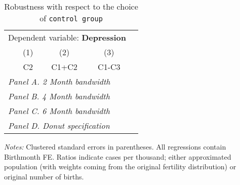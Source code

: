  \begin{table}[H] \begin{threeparttable} \centering \caption{Robustness with respect to the choice of \texttt{control group}} {\def\sym#1{\ifmmode^{#1}\else\(^{#1}\)\fi} \begin{tabular}{l*{4}{c}} \toprule \multicolumn{4}{c}{Dependent variable: \textbf{Depression}} \\ \cmidrule(lr){2-4}
            &\multicolumn{1}{c}{(1)}&\multicolumn{1}{c}{(2)}&\multicolumn{1}{c}{(3)}\\
            &\multicolumn{1}{c}{C2}&\multicolumn{1}{c}{C1+C2}&\multicolumn{1}{c}{C1-C3}\\
\midrule
 \multicolumn{4}{l}{\emph{Panel A. 2 Month bandwidth}} \\    \midrule\multicolumn{4}{l}{\emph{Panel B. 4 Month bandwidth}} \\    \midrule\multicolumn{4}{l}{\emph{Panel C. 6 Month bandwidth}} \\    \midrule\multicolumn{4}{l}{\emph{Panel D. Donut specification}} \\    
\bottomrule \end{tabular} } \begin{tablenotes} \item \scriptsize \emph{Notes:} Clustered standard errors in parentheses. All regressions contain Birthmonth FE. Ratios indicate cases per thousand; either approximated population (with weights coming from the original fertility distribution) or original number of births. \end{tablenotes} \end{threeparttable} \end{table} 

